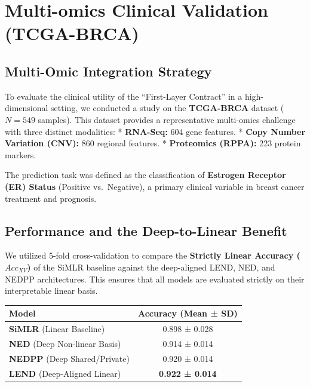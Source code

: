 \documentclass[
  letterpaper,
]{report}
\newcounter{none} %
\begin{document}
\chapter{Multi-omics Clinical Validation
(TCGA-BRCA)}\label{multi-omics-clinical-validation-tcga-brca}

\section{Multi-Omic Integration
Strategy}\label{multi-omic-integration-strategy}

To evaluate the clinical utility of the ``First-Layer Contract'' in a
high-dimensional setting, we conducted a study on the \textbf{TCGA-BRCA}
dataset (\(N=549\) samples). This dataset provides a representative
multi-omics challenge with three distinct modalities: *
\textbf{RNA-Seq:} 604 gene features. * \textbf{Copy Number Variation
(CNV):} 860 regional features. * \textbf{Proteomics (RPPA):} 223 protein
markers.

The prediction task was defined as the classification of
\textbf{Estrogen Receptor (ER) Status} (Positive vs.~Negative), a
primary clinical variable in breast cancer treatment and prognosis.

\section{Performance and the Deep-to-Linear
Benefit}\label{performance-and-the-deep-to-linear-benefit}

We utilized 5-fold cross-validation to compare the \textbf{Strictly
Linear Accuracy (\(Acc_{XV}\))} of the SiMLR baseline against the
deep-aligned LEND, NED, and NEDPP architectures. This ensures that all
models are evaluated strictly on their interpretable linear basis.

{\def\LTcaptype{none} %
\begin{longtable}[]{@{}lc@{}}
\toprule\noalign{}
Model & Accuracy (Mean ± SD) \\
\midrule\noalign{}
\endhead
\bottomrule\noalign{}
\endlastfoot
\textbf{SiMLR} (Linear Baseline) & 0.898 ± 0.028 \\
\textbf{NED} (Deep Non-linear Basis) & 0.914 ± 0.014 \\
\textbf{NEDPP} (Deep Shared/Private) & 0.920 ± 0.014 \\
\textbf{LEND} (Deep-Aligned Linear) & \textbf{0.922 ± 0.014} \\
\end{longtable}
}
\end{document}
